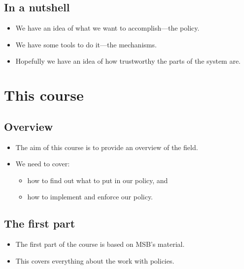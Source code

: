 \documentclass{beamer}
\begin{document}
\subsection{In a nutshell}

\begin{frame}{\insertsubsectionhead}
  \begin{itemize}
    \item We have an idea of what we want to accomplish---the policy.
    \item We have some tools to do it---the mechanisms.
    \item Hopefully we have an idea of how trustworthy the parts of the system 
      are.
  \end{itemize}
\end{frame}


\section{This course}

\subsection{Overview}

\begin{frame}{\insertsubsectionhead}
  \begin{itemize}
    \item The aim of this course is to provide an overview of the field.
    \item We need to cover:
      \begin{itemize}
        \item how to find out what to put in our policy, and
        \item how to implement and enforce our policy.
      \end{itemize}
  \end{itemize}
\end{frame}

\subsection{The first part}

\begin{frame}{\insertsubsectionhead}
  \begin{itemize}
    \item The first part of the course is based on MSB's material.
    \item This covers everything about the work with policies.
  \end{itemize}
\end{frame}
\end{document}
